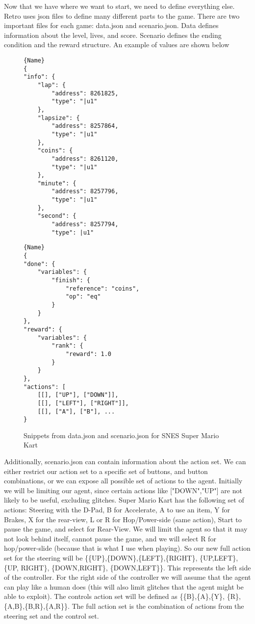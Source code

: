 Now that we have where we want to start, we need to define everything else.  
Retro uses json files to define many different parts to the game. There are 
two important files for each game: data.json and scenario.json. Data defines
information about the level, lives, and score. Scenario defines the
ending condition and the reward structure. An example of values are shown
below
\\
\begin{figure}[h!]
\begin{minipage}{0.47\textwidth}
    \begin{lstlisting}[caption=data.json, frame=tlrb]{Name}
{
"info": {
    "lap": {
        "address": 8261825,
        "type": "|u1"
    },
    "lapsize": {
        "address": 8257864,
        "type": "|u1"
    },
    "coins": {
        "address": 8261120,
        "type": "|u1"
    },
    "minute": {
        "address": 8257796,
        "type": "|u1"
    },
    "second": {
        "address": 8257794,
        "type": |u1"
    \end{lstlisting}
\end{minipage}\hfill
\begin{minipage}{0.47\textwidth}
    \begin{lstlisting}[caption=scenario.json, frame=tlrb]{Name}
{
"done": {
    "variables": {
        "finish": {
            "reference": "coins",
            "op": "eq"
        }
    }
},
"reward": {
    "variables": {
        "rank": {
            "reward": 1.0
        }
    }
},
"actions": [
    [[], ["UP"], ["DOWN"]],
    [[], ["LEFT"], ["RIGHT"]],
    [[], ["A"], ["B"], ...
}
    \end{lstlisting}
\end{minipage}
    \caption{Snippets from data.json and scenario.json for SNES Super Mario Kart}
\end{figure}
Additionally, scenario.json can contain information about the action set. We can
either restrict our action set to a specific set of buttons, and button 
combinations, or we can expose all possible set of actions to the agent. Initially
we will be limiting our agent, since certain actions like ["DOWN","UP"] are
not likely to be useful, excluding glitches. Super Mario Kart has the following
set of actions: Steering with the D-Pad, B for Accelerate, A to use an item, 
Y for Brakes, X for the rear-view, L or R for Hop/Power-side (same action), 
Start to pause the game, and select for Rear-View. We will limit the agent
so that it may not look behind itself, cannot pause the game, and we will select
R for hop/power-slide (because that is what I use when playing). So our new full
action set for the steering will be \{\{UP\},\{DOWN\},\{LEFT\},\{RIGHT\},
\{UP,LEFT\}, \{UP, RIGHT\}, \{DOWN,RIGHT\}, \{DOWN,LEFT\}\}. 
This represents the left side of the controller. For the right side of the 
controller we will assume that the agent can play like a human does 
(this will also limit glitches that the agent might be able to exploit). 
The controls action set will be defined as \{\{B\},\{A\},\{Y\},
\{R\},\{A,B\},\{B,R\},\{A,R\}\}. The full action set is the combination of 
actions from the steering set and the control set. 

